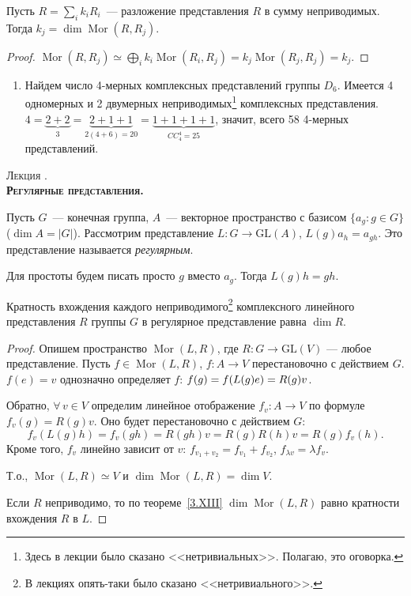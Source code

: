 \documentclass[a4paper]{article}
\newcounter{lec}
\renewcommand{\thelec}{\Roman{lec}}
\newcommand*{\lecture}[1]{\refstepcounter{lec}\vspace{20pt}
\begin{center}{\rmfamily\textsc{Лекция \thelec. \\ \textbf{#1}}}\vspace{5pt}
\end{center}}
\newcommand{\Mor}{\mathop{\mathrm{Mor}}\nolimits}
\newcommand*{\p}[1]{#1\nobreak\discretionary{}{\hbox{$\mathsurround=0pt #1$}}{}}
\begin{document}
\begin{sled}
Пусть $R=\sum\limits_i k_iR_i$~--- разложение представления $R$ в
сумму неприводимых. Тогда $k_j=\dim\Mor(R,R_j)$.
\end{sled}

\begin{proof}
$\Mor(R,R_j)\simeq \bigoplus\limits_ik_i\Mor(R_i,
R_j)=k_j\Mor(R_j,R_j)=k_j$.
\end{proof}

\prim
\begin{enumerate}
  \item Найдем число 4-мерных комплексных представлений группы
  $D_6$. Имеется 4 одномерных и 2 двумерных неприводимых\footnote{Здесь
  в лекции было сказано <<нетривиальных>>. Полагаю, это оговорка.} комплексных
  представления. $4=\underbrace{2+2}_{3}=\underbrace{2+1+1}_{2(4+6)=20}=
  \underbrace{1+1+1+1}_{CC^4_4=25}$, значит, всего 58 4-мерных
  представлений.
\end{enumerate}
\lecture{Регулярные представления.}

Пусть $G$~--- конечная группа, $A$~--- векторное пространство с
базисом $\{a_g: g\in G\}$ ($\dim A=|G|$). Рассмотрим представление
$L\colon G\to \mathrm{GL}(A)$, $L(g)a_h=a_{gh}$. Это представление
называется \emph{регулярным}.

Для простоты будем писать просто $g$ вместо $a_g$. Тогда $L(g)h=gh$.

\begin{theorem}
Кратность вхождения каждого неприводимого\footnote{В лекциях
опять-таки было сказано <<нетривиального>>.} комплексного линейного
представления $R$ группы $G$ в регулярное представление равна $\dim
R$.
\end{theorem}

\begin{proof}
Опишем пространство $\Mor(L, R)$, где $R\colon G\to \mathrm{GL}(V)$
--- любое представление. Пусть $f\in \Mor(L,R)$, $f\colon A\to V$
перестановочно с действием $G$. $f(e)=v$ однозначно определяет $f$:
$f(g)=f(L(g)e)\p=R(g)v$.

Обратно, $\forall \, v\in V$ определим линейное отображение
$f_v\colon A\to V$ по формуле $f_v(g)=R(g)v$. Оно будет
перестановочно с действием $G$:
$$f_v(L(g)h)=f_v(gh)=R(gh)v=R(g)R(h)v=R(g)f_v(h).$$ Кроме того,
$f_v$ линейно зависит от $v$: $f_{v_1+v_2}=f_{v_1}+f_{v_2}$,
$f_{\lambda v}=\lambda f_v$.

Т.о., $\Mor(L,R)\simeq V$ и $\dim \Mor(L,R)=\dim V$.

Если $R$ неприводимо, то по теореме~\ref{3.XIII} $\dim \Mor(L,R)$
равно кратности вхождения $R$ в $L$.
\end{proof}
\end{document}

